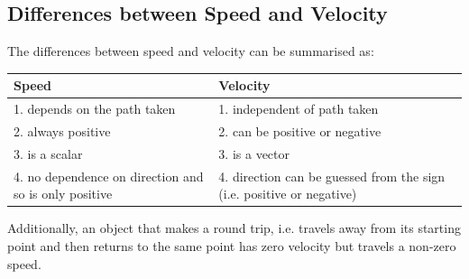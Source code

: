             \subsection*{Differences between Speed and Velocity}
            \nopagebreak
        \label{m38791*id66482}The differences between speed and velocity can be summarised as:\par 
\begin{center}
\begin{tabular}{|p{5cm}|p{5cm}|}\hline
\textbf{Speed} & \textbf{Velocity} \\\hline
1. depends on the path taken & 1. independent of path taken \\\hline
2. always positive & 2. can be positive or negative \\\hline
3. is a scalar & 3. is a vector \\\hline
4. no dependence on direction and so is only positive & 4. direction can be guessed from the sign (i.e. positive or negative) \\\hline
\end{tabular}
\end{center}
    \par
        \label{m38791*id66611}Additionally, an object that makes a round trip, i.e. travels away from its starting point and then returns to the same point has zero velocity but travels a non-zero speed.\par 
\label{m38791*secfhsst!!!underscore!!!id1252}
